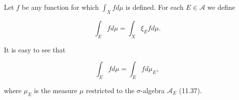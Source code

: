 Let $f$ be any function for which $\int_X f d\mu$ is defined. For each $E \in \mathcal{A}$ we define

$$\int_E f d\mu = \int_X \xi_E f d\mu.$$

It is easy to see that

$$\int_E f d\mu = \int_E f d\mu_E,$$

where $\mu_E$ is the measure $\mu$ restricted to the $\sigma$-algebra $\mathcal{A}_E$ (11.37).